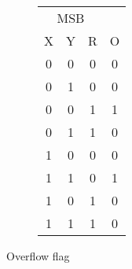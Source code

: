\begin{figure}[ht]
    \centering
    \hfill
    \begin{subfigure}[h]{0.3\textwidth}
        \begin{tabular}{ccc|c}
            \multicolumn{3}{c}{MSB} & \\
            X & Y & R & O \\
            \hline
            0 & 0 & 0 & 0 \\
            0 & 1 & 0 & 0 \\
            0 & 0 & 1 & 1 \\
            0 & 1 & 1 & 0 \\
            1 & 0 & 0 & 0 \\
            1 & 1 & 0 & 1 \\
            1 & 0 & 1 & 0 \\
            1 & 1 & 1 & 0 \\
        \end{tabular}
    \end{subfigure}
    \begin{subfigure}[h]{0.5\textwidth}
        
    \end{subfigure}
    \hfill
    \caption{Overflow flag}
    \label{fig:arch:overflow_flag}
\end{figure}

